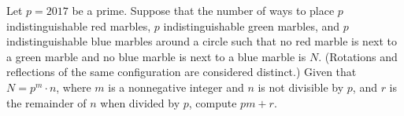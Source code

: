 Let $p=2017$ be a prime. Suppose that the number of ways to place $p$ indistinguishable red marbles, $p$ indistinguishable green marbles, and $p$ indistinguishable blue marbles around a circle such that no red marble is next to a green marble and no blue marble is next to a blue marble is $N$. (Rotations and reflections of the same configuration are considered distinct.) Given that $N=p^m\cdot n$, where $m$ is a nonnegative integer and $n$ is not divisible by $p$, and $r$ is the remainder of $n$ when divided by $p$, compute $pm+r$.
